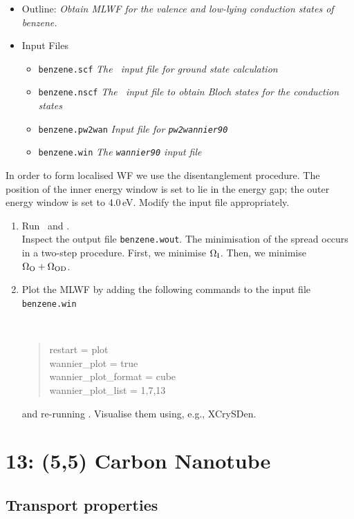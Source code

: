 \documentclass[a4paper,11pt,twoside]{article}
\begin{document}
\begin{itemize}
\item{Outline: \it{Obtain MLWF for the valence and low-lying
    conduction states of benzene.}} 
\item{Input Files}
\begin{itemize}
\item{ {\tt benzene.scf}  {\it The \pwscf\ input file for ground state
    calculation}} 
\item{ {\tt benzene.nscf}  {\it The \pwscf\ input file to obtain Bloch
    states for the conduction states}} 
\item{ {\tt benzene.pw2wan}  {\it Input file for {\tt pw2wannier90}}}
\item{ {\tt benzene.win}  {\it The {\tt wannier90} input file}}
\end{itemize}
\end{itemize}
In order to form localised WF we use the disentanglement
procedure. The position of the inner energy window is set to lie in
the energy gap; the outer energy window is set to 4.0\,eV. Modify the
input file appropriately. 
\begin{enumerate}
\item Run \pwscf\ and \wannier.\\
Inspect the output file {\tt benzene.wout}. The minimisation of the
spread occurs in a two-step procedure. First, we minimise $\Omega_{\rm
  I}$. Then, we minimise $\Omega_{\rm O}+\Omega_{{\rm OD}}$.

\item Plot the MLWF by adding the following commands to the
 input file {\tt benzene.win}
{\tt
\begin{quote}
restart               = plot\\
wannier\_plot         = true\\
wannier\_plot\_format = cube\\
wannier\_plot\_list   = 1,7,13
\end{quote} }
and re-running \wannier. Visualise them using, e.g., XCrySDen. 
\end{enumerate}

\cleardoublepage

\section*{13: (5,5) Carbon Nanotube}
\subsection*{Transport properties}
\end{document}
